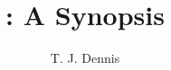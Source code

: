 \documentclass[12pt, letterpaper, oneside, leqno, openright]{memoir}
\title{\textsf{\coronos}: A Synopsis}
\author{T. J. Dennis}
\begin{document}
\frontmatter
 \begin{titlingpage}
   \setlength{\droptitle}{30pt}
  \maketitle
  \begin{abstract}
    \lipsum[1-1]
  \end{abstract}
 \end{titlingpage}
\tableofcontents
\mainmatter
%
%
\maketitle
\end{document}
